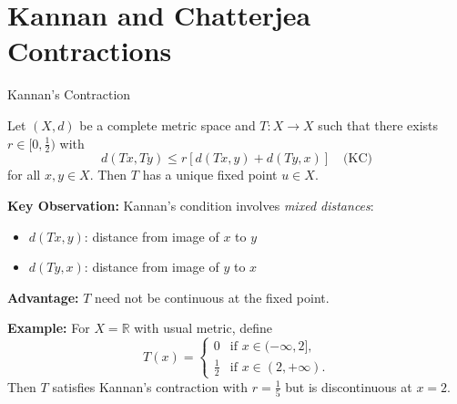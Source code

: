 \documentclass[aspectratio=169,10pt]{beamer}
\begin{document}
\section{Kannan and Chatterjea Contractions}

\begin{frame}{Kannan's Contraction}
  \begin{theorem}[Kannan, 1968]
    Let $(X, d)$ be a complete metric space and $T : X \to X$ such that there exists
    $r \in [0, \tfrac{1}{2})$ with
    \[
      d(Tx, Ty) \leq r[d(Tx, y) + d(Ty, x)] \quad \text{(KC)}
    \]
    for all $x, y \in X$. Then $T$ has a unique fixed point $u \in X$.
  \end{theorem}

  \vspace{0.3cm}

  \textbf{Key Observation:} Kannan's condition involves \emph{mixed distances}:
  \begin{itemize}
    \item $d(Tx, y)$: distance from image of $x$ to $y$
    \item $d(Ty, x)$: distance from image of $y$ to $x$
  \end{itemize}

  \vspace{0.3cm}

  \textbf{Advantage:} $T$ need not be continuous at the fixed point.

  \vspace{0.3cm}

  \textbf{Example:} For $X = \mathbb{R}$ with usual metric, define
  \[
    T(x) = \begin{cases} 0 & \text{if } x \in (-\infty, 2], \\ \frac{1}{2} & \text{if } x \in (2, +\infty). \end{cases}
  \]
  Then $T$ satisfies Kannan's contraction with $r = \tfrac{1}{5}$ but is discontinuous at $x=2$.
\end{frame}
\end{document}
